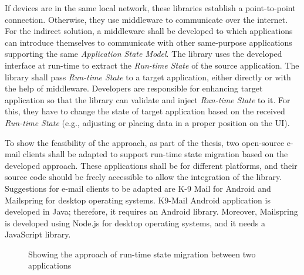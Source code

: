If devices are in the same local network, these libraries establish a point-to-point connection. Otherwise, they use middleware to communicate over the internet.
For the indirect solution, a middleware shall be developed to which applications can introduce themselves to communicate with other same-purpose applications supporting the same \textit{Application State Model}. 
The library uses the developed interface at run-time to extract the \textit{Run-time State} of the source application. The library shall pass \textit{Run-time State} to a target application, either directly or with the help of middleware. 
Developers are responsible for enhancing target application so that the library can validate and inject \textit{Run-time State} to it. 
For this, they have to change the state of target application based on the received \textit{Run-time State} (e.g., adjusting or placing data in a proper position on the UI). 

To show the feasibility of the approach, as part of the thesis, two open-source e-mail clients shall be adapted to support run-time state migration based on the developed approach. These applications shall be for different platforms, and their source code should be freely accessible to allow the integration of the library.
Suggestions for e-mail clients to be adapted are K-9 Mail for Android and Mailspring for desktop operating systems.
K9-Mail Android application is developed in Java; therefore, it requires an Android library. Moreover, Mailspring is developed using Node.js for desktop operating systems, and it needs a JavaScript library.

\begin{figure}[!b]
    
    \caption{Showing the approach of run-time state migration between two applications }
    \label{fig:solution}
\end{figure}
